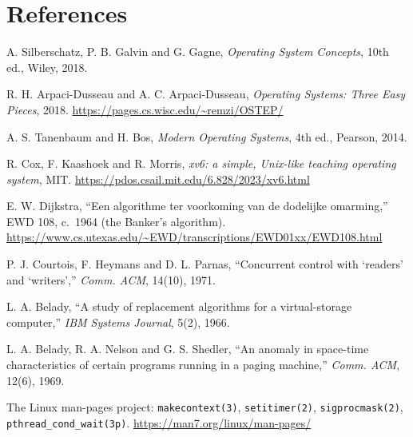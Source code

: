 \documentclass[12pt,a4paper]{article}
\begin{document}
\section{References}

{\footnotesize\sloppy
\begin{enumerate}[label={[\arabic*]}, leftmargin=2.2em, itemsep=0pt]
  \item A. Silberschatz, P. B. Galvin and G. Gagne, \textit{Operating System Concepts}, 10th ed., Wiley, 2018.
  \item R. H. Arpaci-Dusseau and A. C. Arpaci-Dusseau, \textit{Operating Systems: Three Easy Pieces}, 2018. \url{https://pages.cs.wisc.edu/~remzi/OSTEP/}
  \item A. S. Tanenbaum and H. Bos, \textit{Modern Operating Systems}, 4th ed., Pearson, 2014.
  \item R. Cox, F. Kaashoek and R. Morris, \textit{xv6: a simple, Unix-like teaching operating system}, MIT. \url{https://pdos.csail.mit.edu/6.828/2023/xv6.html}
  \item E. W. Dijkstra, ``Een algorithme ter voorkoming van de dodelijke omarming,'' EWD 108, c.~1964 (the Banker's algorithm). \url{https://www.cs.utexas.edu/~EWD/transcriptions/EWD01xx/EWD108.html}
  \item P. J. Courtois, F. Heymans and D. L. Parnas, ``Concurrent control with `readers' and `writers','' \textit{Comm. ACM}, 14(10), 1971.
  \item L. A. Belady, ``A study of replacement algorithms for a virtual-storage computer,'' \textit{IBM Systems Journal}, 5(2), 1966.
  \item L. A. Belady, R. A. Nelson and G. S. Shedler, ``An anomaly in space-time characteristics of certain programs running in a paging machine,'' \textit{Comm. ACM}, 12(6), 1969.
  \item The Linux man-pages project: \texttt{makecontext(3)}, \texttt{setitimer(2)}, \texttt{sigprocmask(2)}, \texttt{pthread\_cond\_wait(3p)}. \url{https://man7.org/linux/man-pages/}
\end{enumerate}
}
\end{document}

